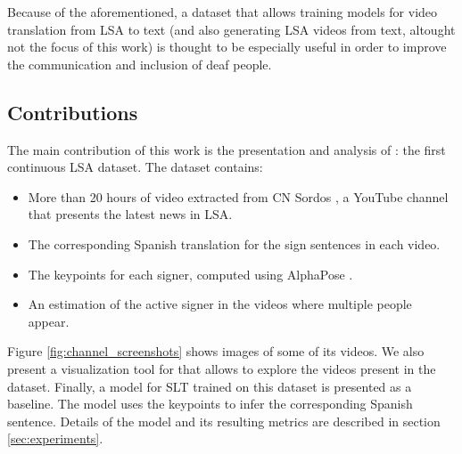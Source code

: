 Because of the aforementioned, a dataset that allows training models for video translation from LSA to text (and also generating LSA videos from text, altought not the focus of this work) is thought to be especially useful in order to improve the communication and inclusion of deaf people.



\subsection{Contributions}

The main contribution of this work is the presentation and analysis of \dbname: the first continuous LSA dataset. The dataset contains:

\begin{itemize}
    
    \item More than 20 hours of video extracted from CN Sordos \cite{url:cnsordos}, a YouTube channel that presents the latest news in LSA.
    
    \item The corresponding Spanish translation for the sign sentences in each video.
    
    \item The keypoints for each signer, computed using AlphaPose \cite{fang2017rmpe}.
    
    \item An estimation of the active signer in the videos where multiple people appear.

\end{itemize}

Figure \ref{fig:channel_screenshots} shows images of some of its videos. We also present a visualization tool for \dbname that allows to explore the videos present in the dataset. Finally, a model for SLT trained on this dataset is presented as a baseline. The model uses the keypoints to infer the corresponding Spanish sentence. Details of the model and its resulting metrics are described in section \ref{sec:experiments}.
